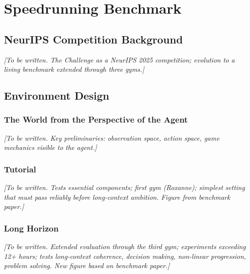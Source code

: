 
\newpage
\section{Speedrunning Benchmark}\label{sec:benchmark}

\subsection{NeurIPS Competition Background}\label{sec:neurips_background}

\textit{[To be written. The \pokeagent{} Challenge as a NeurIPS 2025 competition; evolution to a living benchmark extended through three gyms.]}

\subsection{Environment Design}\label{sec:environment_design}

\subsubsection{The World from the Perspective of the Agent}\label{sec:agent_perspective}

\textit{[To be written. Key preliminaries: observation space, action space, game mechanics visible to the agent.]}

\subsubsection{Tutorial}\label{sec:tutorial}

\textit{[To be written. Tests essential components; first gym (Roxanne); simplest setting that must pass reliably before long-context ambition. Figure from benchmark paper.]}

\subsubsection{Long Horizon}\label{sec:long_horizon}

\textit{[To be written. Extended evaluation through the third gym; experiments exceeding 12+ hours; tests long-context coherence, decision making, non-linear progression, problem solving. New figure based on benchmark paper.]}

